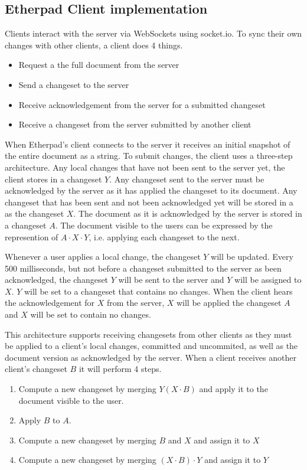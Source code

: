 \subsection{Etherpad Client implementation}

Clients interact with the server via WebSockets using socket.io. To sync their own changes with other clients, a client does 4 things.

\begin{itemize}
\item Request a the full document from the server
\item Send a changeset to the server
\item Receive acknowledgement from the server for a submitted changeset
\item Receive a changeset from the server submitted by another client
\end{itemize}

\noindent When Etherpad's client connects to the server it receives an initial snapshot of the entire document as a string. To submit changes, the client uses a three-step architecture. Any local changes that have not been sent to the server yet, the client stores in a changeset $Y$. Any changeset sent to the server must be acknowledged by the server as it has applied  the changeset to its document. Any changeset that has been sent and not been acknowledged yet will be stored in a as the changeset $X$. The document as it is acknowledged by the server is stored in a changeset $A$. The document visible to the users can be expressed by the represention of $A \cdot X \cdot Y$, i.e. applying each changeset to the next.

Whenever a user applies a local change, the changeset $Y$ will be updated. Every 500 milliseconds, but not before a changeset submitted to the server as been acknowledged, the changeset $Y$ will be sent to the server and $Y$ will be assigned to $X$. $Y$ will be set to a changeset that contains no changes. When the client hears the acknowledgement for $X$ from the server, $X$ will be applied the changeset $A$ and $X$ will be set to contain no changes.

This architecture supports receiving changesets from other clients as they must be applied to a client's local changes, committed and uncommited, as well as the document version as acknowledged by the server. When a client receives another client's changeset $B$ it will perform 4 steps.

\begin{enumerate}
\item Compute a new changeset by merging $Y (X \cdot B)$ and apply it to the document visible to the user.
\item Apply $B$ to $A$.
\item Compute a new changeset by merging $B$ and $X$ and assign it to $X$
\item Compute a new changeset by merging $(X \cdot B) \cdot Y$ and assign it to $Y$
\end{enumerate}

